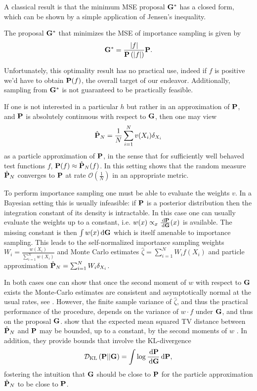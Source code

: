 A classical result is that the minimum MSE proposal $\G^\ast$ has a closed form, which can be shown by a simple application of Jensen's inequality. 
\begin{proposition}
    \label{prop:minimum_MSE_IS}
    The proposal $\G^{\ast}$ that minimizes the MSE of importance sampling is given by
    $$
    \G^{\ast}  = \frac{\lvert f \rvert}{\P\left(\lvert f \rvert \right)} \P.
    $$
\end{proposition}
Unfortunately, this optimality result has no practical use, indeed if $f$ is positive we'd have to obtain $\P(f)$, the overall target of our endeavor. Additionally, sampling from $\G^{\ast}$ is not guaranteed to be practically feasible. 

If one is not interested in a particular $h$ but rather in an approximation of $\P$, and $\P$ is absolutely continuous with respect to $\G$, then one may view 
\begin{align}
\label{eq:is-particle-approximation}
\hat \P_N = \frac{1}{N} \sum_{i = 1}^{N} v(X_i) \delta_{X_i}
\end{align}
as a particle approximation of $\P$, in the sense that for sufficiently well behaved test functions $f$, $\P (f) \approx \hat\P_{N}(f)$. In this setting \cite{Agapiou2017Importance} shows that the random measure $\hat \P_N$ converges to $\P$ at rate $\mathcal O\left(\frac 1 N\right)$ in an appropriate metric. 

To perform importance sampling one must be able to evaluate the weights $v$. In a Bayesian setting this is usually infeasible: if $\P$ is a posterior distribution then the integration constant of its density is intractable.
In this case one can usually evaluate the weights up to a constant, i.e. $w(x) \propto_x \frac{\d \P}{\d \G}(x)$ is available. The missing constant is then $\int w(x) \d \G$ which is itself amenable to importance sampling.
This leads to the self-normalized importance sampling weights $W_i = \frac{w(X_i)}{\sum_{i = 1}^N w(X_i)}$ and Monte Carlo estimates $\hat \zeta = \sum_{i = 1}^{N} W_i f(X_i)$ and particle approximation $\hat \P_N = \sum_{i = 1}^{N} W_i \delta_{X_i}$.

In both cases one can show that once the second moment of $w$ with respect to $\G$ exists the Monte-Carlo estimates are consistent and asymptotically normal at the usual rates, see \cite[Chapter 8]{Chopin2020Introduction}. 
However, the finite sample variance of $\hat\zeta$, and thus the practical performance of the procedure, depends on the variance of $w\cdot f$ under $\G$, and thus on the proposal $\G$. \cite{Agapiou2017Importance} show that  the expected mean squared TV distance  between $\hat \P_N$ and  $\P$ may be bounded, up to a constant, by the second moments of $w$ . In addition, they provide bounds that involve the KL-divergence 
$$
\Dkl{\P}{\G} = \int \log \frac{\d \P}{\d \G} \d \P,
$$
fostering the intuition that $\G$ should be close to $\P$ for the particle approximation $\hat\P_{N}$ to be close to $\P$.

